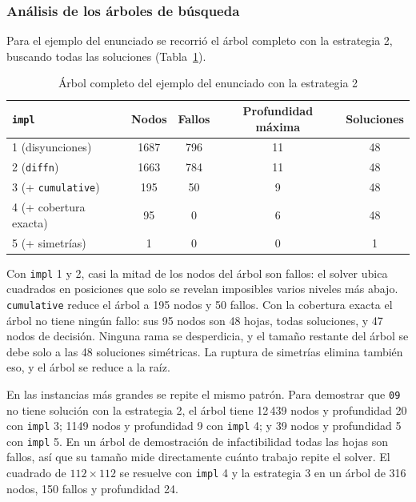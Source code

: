 \subsubsection{Análisis de los árboles de búsqueda}

Para el ejemplo del enunciado se recorrió el árbol completo con la estrategia 2, buscando todas las soluciones (Tabla~\ref{tab:rect-arbol}).

\begin{table}[htbp]
    \caption{Árbol completo del ejemplo del enunciado con la estrategia 2}
    \label{tab:rect-arbol}
    \begin{tabular}{@{}lcccc@{}}
        \toprule
        \texttt{impl}                  & Nodos & Fallos & Profundidad máxima & Soluciones \\
        \midrule
        1 (disyunciones)               & 1687  & 796    & 11                 & 48         \\
        2 (\texttt{diffn})             & 1663  & 784    & 11                 & 48         \\
        3 (+ \texttt{cumulative})      & 195   & 50     & 9                  & 48         \\
        4 (+ cobertura exacta)         & 95    & 0      & 6                  & 48         \\
        5 (+ simetrías)                & 1     & 0      & 0                  & 1          \\
        \bottomrule
    \end{tabular}
\end{table}

Con \texttt{impl} 1 y 2, casi la mitad de los nodos del árbol son fallos: el solver ubica cuadrados en posiciones que solo se revelan imposibles varios niveles más abajo. \texttt{cumulative} reduce el árbol a 195 nodos y 50 fallos. Con la cobertura exacta el árbol no tiene ningún fallo: sus 95 nodos son 48 hojas, todas soluciones, y 47 nodos de decisión. Ninguna rama se desperdicia, y el tamaño restante del árbol se debe solo a las 48 soluciones simétricas. La ruptura de simetrías elimina también eso, y el árbol se reduce a la raíz.

En las instancias más grandes se repite el mismo patrón. Para demostrar que \texttt{09} no tiene solución con la estrategia 2, el árbol tiene 12\,439 nodos y profundidad 20 con \texttt{impl} 3; 1149 nodos y profundidad 9 con \texttt{impl} 4; y 39 nodos y profundidad 5 con \texttt{impl} 5. En un árbol de demostración de infactibilidad todas las hojas son fallos, así que su tamaño mide directamente cuánto trabajo repite el solver. El cuadrado de $112 \times 112$ se resuelve con \texttt{impl} 4 y la estrategia 3 en un árbol de 316 nodos, 150 fallos y profundidad 24.

